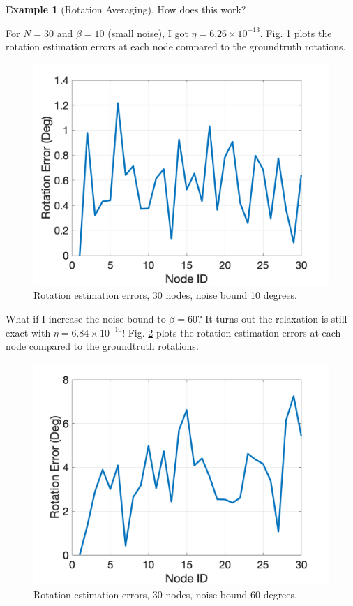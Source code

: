 \documentclass[
]{book}
\theoremstyle{definition}
\theoremstyle{definition}
\newtheorem{example}{Example}[chapter]
\theoremstyle{definition}
\theoremstyle{definition}
\theoremstyle{remark}
\begin{document}
\begin{example}[Rotation Averaging]
How does this work?

For \(N=30\) and \(\beta = 10\) (small noise), I got \(\eta = 6.26\times 10^{-13}\). Fig. \ref{fig:MVA-rot-err-30-10} plots the rotation estimation errors at each node compared to the groundtruth rotations.

\begin{figure}

{\centering \includegraphics[width=0.6\linewidth]{images/mva_rot_err_30_10} 

}

\caption{Rotation estimation errors, 30 nodes, noise bound 10 degrees.}\label{fig:MVA-rot-err-30-10}
\end{figure}

What if I increase the noise bound to \(\beta = 60\)? It turns out the relaxation is still exact with \(\eta = 6.84 \times 10^{-10}\)! Fig. \ref{fig:MVA-rot-err-30-60} plots the rotation estimation errors at each node compared to the groundtruth rotations.

\begin{figure}

{\centering \includegraphics[width=0.6\linewidth]{images/mva_rot_err_30_60} 

}

\caption{Rotation estimation errors, 30 nodes, noise bound 60 degrees.}\label{fig:MVA-rot-err-30-60}
\end{figure}


\end{example}
\end{document}
